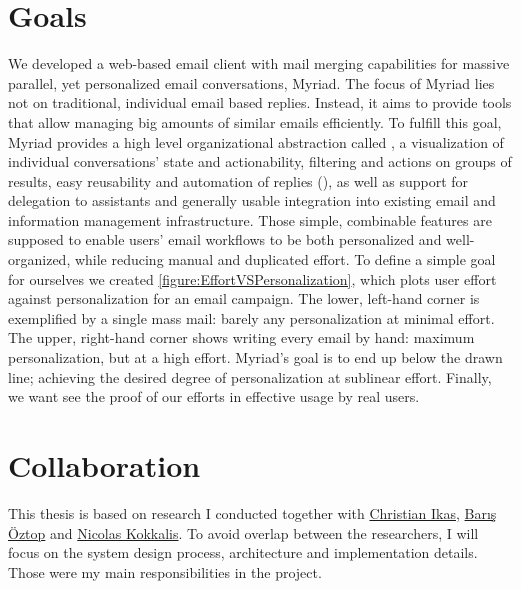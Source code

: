\section{Goals}
\label{section:Goals}

We developed a web-based email client with mail merging capabilities for massive parallel, yet personalized email conversations, Myriad. The focus of Myriad lies not on traditional, individual email based replies. Instead, it aims to provide tools that allow managing big amounts of similar emails efficiently.
To fulfill this goal, Myriad provides a high level organizational abstraction called , a visualization of individual conversations' state and actionability, filtering and actions on groups of results, easy reusability and automation of replies (), as well as support for delegation to assistants and generally usable integration into existing email and information management infrastructure.
Those simple, combinable features are supposed to enable users' email workflows to be both personalized and well-organized, while reducing manual and duplicated effort. To define a simple goal for ourselves we created \autoref{figure:EffortVSPersonalization}, which plots user effort against personalization for an email campaign. The lower, left-hand corner is exemplified by a single mass mail: barely any personalization at minimal effort. The upper, right-hand corner shows writing every email by hand: maximum personalization, but at a high effort. Myriad's goal is to end up below the drawn line; achieving the desired degree of personalization at sublinear effort.
Finally, we want see the proof of our efforts in effective usage by real users.


\section{Collaboration}

This thesis is based on research I conducted together with \href{mailto:ikas@in.tum.de}{Christian Ikas}, \href{mailto:boztop@gmail.com}{Barış Öztop} and \href{mailto:nicolas@cs.stanford.edu}{Nicolas Kokkalis}. To avoid overlap between the researchers, I will focus on the system design process, architecture and implementation details. Those were my main responsibilities in the project.

